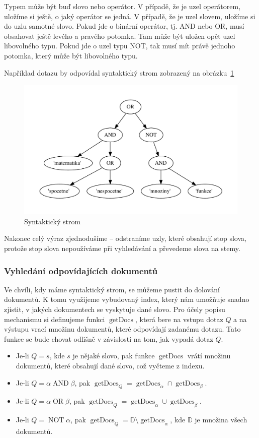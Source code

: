 \documentclass[12pt]{article}
\newcommand{\sssection}[1]{\subsubsection{#1}}
\DeclareMathOperator{\getdocs}{getDocs}
\DeclareMathOperator{\AND}{AND}
\DeclareMathOperator{\OR}{OR}
\DeclareMathOperator{\NOT}{NOT}
\begin{document}
Typem může být buď slovo nebo operátor. V případě, že je uzel operátorem, uložíme si ještě, o jaký operátor se jedná. V případě, že je uzel slovem, uložíme si do uzlu samotné slovo. Pokud jde o binární operátor, tj. AND nebo OR, musí obsahovat ještě levého a pravého potomka. Tam může být uložen opět uzel libovolného typu. Pokud jde o uzel typu NOT, tak musí mít právě jednoho potomka, který může být libovolného typu. 

Například dotazu  by odpovídal syntaktický strom zobrazený na obrázku~\ref{fig:syntree}

\begin{figure}
  \centering
  \includegraphics[width=14cm]{obrazky/syntactic_tree.pdf}
  \caption{Syntaktický strom}
  \label{fig:syntree}
\end{figure}

Nakonec celý výraz zjednodušíme -- odstraníme uzly, které obsahují stop slova, protože stop slova nepoužíváme při vyhledávání a převedeme slova na stemy. 

\sssection{Vyhledání odpovídajících dokumentů}

Ve chvíli, kdy máme syntaktický strom, se můžeme pustit do dolování dokumentů. K tomu využijeme vybudovaný index, který nám umožňuje snadno zjistit, v jakých dokumentech se vyskytuje dané slovo. Pro účely popisu mechanismu si definujeme funkci $\getdocs$, která bere na vstupu dotaz $Q$ a na výstupu vrací množinu dokumentů, které odpovídají zadanému dotazu. Tato funkce se bude chovat odlišně v závislosti na tom, jak vypadá dotaz $Q$. 

\begin{itemize}
\item Je-li $Q=s$, kde $s$ je nějaké slovo, pak funkce $\getdocs$ vrátí množinu dokumentů, které obsahují dané slovo, což vyčteme z indexu. 
\item Je-li $Q = \alpha \AND \beta$, pak $\getdocs_Q = \getdocs_\alpha \cap \getdocs_\beta$.
\item Je-li $Q = \alpha \OR \beta$, pak $\getdocs_Q = \getdocs_\alpha \cup \getdocs_\beta$.
\item Je-li $Q = \NOT \alpha$, pak $\getdocs_Q = \mathbb{D}\setminus\getdocs_\alpha$, kde $\mathbb{D}$ je množina všech dokumentů.
\end{itemize}
\end{document}
